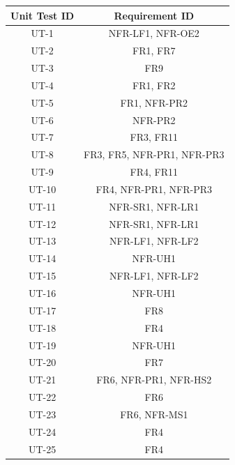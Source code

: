 \documentclass[12pt, titlepage]{article}
\begin{document}
\begin{table}[H]
  \centering
  \begin{tabular}{|c|c|}
  \hline
  \textbf{Unit Test ID} & \textbf{Requirement ID} \\ \hline
  UT-1          & NFR-LF1, NFR-OE2            \\ \hline
  UT-2          & FR1, FR7                    \\ \hline
  UT-3          & FR9                         \\ \hline
  UT-4          & FR1, FR2                    \\ \hline
  UT-5          & FR1, NFR-PR2                \\ \hline
  UT-6          & NFR-PR2                     \\ \hline
  UT-7          & FR3, FR11                   \\ \hline
  UT-8          & FR3, FR5, NFR-PR1, NFR-PR3  \\ \hline
  UT-9          & FR4, FR11                   \\ \hline
  UT-10         & FR4, NFR-PR1, NFR-PR3       \\ \hline
  UT-11         & NFR-SR1, NFR-LR1            \\ \hline
  UT-12         & NFR-SR1, NFR-LR1            \\ \hline
  UT-13         & NFR-LF1, NFR-LF2            \\ \hline
  UT-14         & NFR-UH1                     \\ \hline
  UT-15         & NFR-LF1, NFR-LF2            \\ \hline
  UT-16         & NFR-UH1                     \\ \hline
  UT-17         & FR8                         \\ \hline
  UT-18         & FR4                         \\ \hline
  UT-19         & NFR-UH1                     \\ \hline
  UT-20         & FR7                         \\ \hline
  UT-21         & FR6, NFR-PR1, NFR-HS2       \\ \hline
  UT-22         & FR6                         \\ \hline
  UT-23         & FR6, NFR-MS1                \\ \hline
  UT-24         & FR4                         \\ \hline
  UT-25         & FR4                         \\ \hline

\end{tabular}
\end{table}
\end{document}
